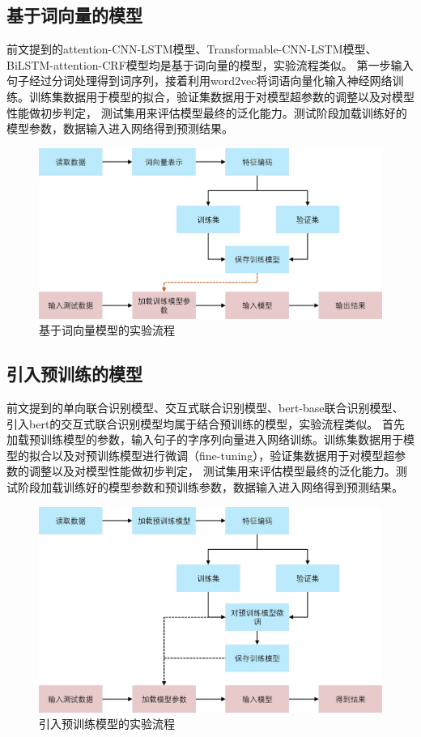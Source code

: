 \subsection{基于词向量的模型}
前文提到的attention-CNN-LSTM模型、Transformable-CNN-LSTM模型、BiLSTM-attention-CRF模型均是基于词向量的模型，实验流程类似。
第一步输入句子经过分词处理得到词序列，接着利用word2vec将词语向量化输入神经网络训练。训练集数据用于模型的拟合，验证集数据用于对模型超参数的调整以及对模型性能做初步判定，
测试集用来评估模型最终的泛化能力。测试阶段加载训练好的模型参数，数据输入进入网络得到预测结果。
\begin{figure}[htbp]
  \centering
  \includegraphics[scale=0.4]{./images/word2vecTrain.jpg}
  \caption{基于词向量模型的实验流程}
  \label{fig:word2vecTrain}
\end{figure}

\subsection{引入预训练的模型}
前文提到的单向联合识别模型、交互式联合识别模型、bert-base联合识别模型、引入bert的交互式联合识别模型均属于结合预训练的模型，实验流程类似。
首先加载预训练模型的参数，输入句子的字序列向量进入网络训练。训练集数据用于模型的拟合以及对预训练模型进行微调（fine-tuning），验证集数据用于对模型超参数的调整以及对模型性能做初步判定，
测试集用来评估模型最终的泛化能力。测试阶段加载训练好的模型参数和预训练参数，数据输入进入网络得到预测结果。
\begin{figure}[htbp]
  \centering
  \includegraphics[scale=0.4]{./images/bertTrain.jpg}
  \caption{引入预训练模型的实验流程}
  \label{fig:bertTrain}
\end{figure}


